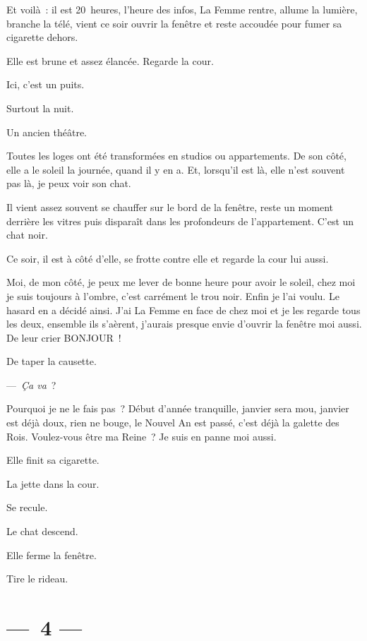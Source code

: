 \documentclass[french,twoside]{book} %
\begin{document}
\noindent Et voilà : il est 20 heures, l’heure des infos, La Femme rentre, allume la lumière, branche la télé, vient ce soir ouvrir la fenêtre et reste accoudée pour fumer sa cigarette dehors.\par
Elle est brune et assez élancée. Regarde la cour.\par
Ici, c’est un puits.\par
Surtout la nuit.\par
Un ancien théâtre.\par
Toutes les loges ont été transformées en studios ou appartements. De son côté, elle a le soleil la journée, quand il y en a. Et, lorsqu’il est là, elle n’est souvent pas là, je peux voir son chat.\par
Il vient assez souvent se chauffer sur le bord de la fenêtre, reste un moment derrière les vitres puis disparaît dans les profondeurs de l’appartement. C’est un chat noir.\par
Ce soir, il est à côté d’elle, se frotte contre elle et regarde la cour lui aussi.\par
Moi, de mon côté, je peux me lever de bonne heure pour avoir le soleil, chez moi je suis toujours à l’ombre, c’est carrément le trou noir. Enfin je l’ai voulu. Le hasard en a décidé ainsi. J’ai La Femme en face de chez moi et je les regarde tous les deux, ensemble ils s’aèrent, j’aurais presque envie d’ouvrir la fenêtre moi aussi. De leur crier BONJOUR !\par
De taper la causette.\par
— \emph{Ça va} ?\par
\bigbreak
\noindent Pourquoi je ne le fais pas ? Début d’année tranquille, janvier sera mou, janvier est déjà doux, rien ne bouge, le Nouvel An est passé, c’est déjà la galette des Rois. Voulez-vous être ma Reine ? Je suis en panne moi aussi.\par
Elle finit sa cigarette.\par
La jette dans la cour.\par
Se recule.\par
Le chat descend.\par
Elle ferme la fenêtre.\par
Tire le rideau.

\section[{— 4 —}]{— 4 —}
\renewcommand{\leftmark}{— 4 —}
\end{document}
